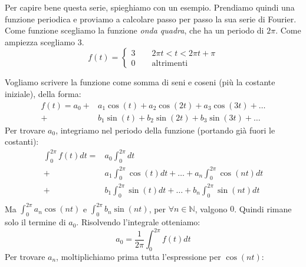 \documentclass[a4paper, titlepage, oneside]{scrbook}
\begin{document}
Per capire bene questa serie, spieghiamo con un esempio. Prendiamo quindi una funzione periodica e proviamo a calcolare passo per passo la sua serie di Fourier.
Come funzione scegliamo la funzione \textit{onda quadra}, che ha un periodo di $2\pi$. Come ampiezza scegliamo $3$.
\begin{equation*}
	f(t)=
	\begin{cases}
		3 \qquad 2\pi t<t<2\pi t+\pi\\
		0 \qquad \text{altrimenti}
	\end{cases}
\end{equation*}
\begin{figure}[h]
	\centering
\end{figure}
Vogliamo scrivere la funzione come somma di seni e coseni (più la costante iniziale), della forma:
\begin{align*}
	f(t)=a_0+&a_1\cos(t)+a_2\cos(2t)+a_3\cos(3t)+\dots\\
			+&b_1\sin(t)+b_2\sin(2t)+b_3\sin(3t)+\dots
\end{align*}
Per trovare $a_0$, integriamo nel periodo della funzione (portando già fuori le costanti):
\begin{align*}
	\int_{0}^{2\pi}f(t)dt=&a_0\int_{0}^{2\pi}dt\\
						 +&a_1\int_{0}^{2\pi}\cos(t)dt+\dots+a_n\int_{0}^{2\pi}\cos(nt)dt\\
  						 +&b_1\int_{0}^{2\pi}\sin(t)dt+\dots+b_n\int_{0}^{2\pi}\sin(nt)dt\\
\end{align*}
Ma $\int_{0}^{2\pi}a_n\cos(nt)$ e $\int_{0}^{2\pi}b_n\sin(nt)$, per $\forall n \in \mathbb{N}$, valgono $0$. Quindi rimane solo il termine di $a_0$.
Risolvendo l'integrale otteniamo:
\begin{equation*}
	a_0=\frac{1}{2\pi}\int_{0}^{2\pi}f(t)dt
\end{equation*}
Per trovare $a_n$, moltiplichiamo prima tutta l'espressione per $\cos(nt)$:
\end{document}
